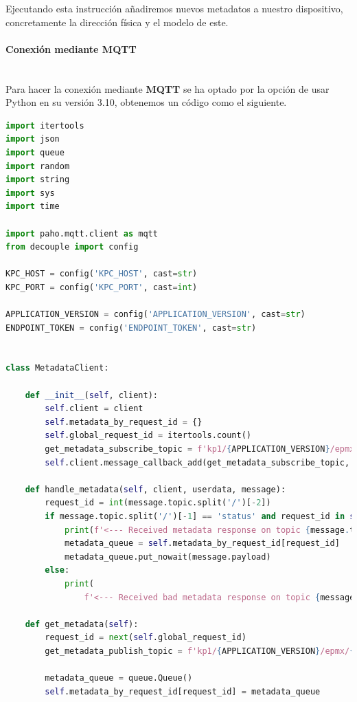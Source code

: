{Ejecutando esta instrucción añadiremos nuevos metadatos a nuestro dispositivo, concretamente la dirección física y el modelo de este.

\paragraph{Conexión mediante MQTT} \label{mqtt-connection} \hspace{0pt} \\

Para hacer la conexión mediante \textbf{MQTT} se ha optado por la opción de usar Python en su versión 3.10, obtenemos un código como el siguiente.

\begin{lstlisting}[language=Python]
import itertools
import json
import queue
import random
import string
import sys
import time

import paho.mqtt.client as mqtt
from decouple import config

KPC_HOST = config('KPC_HOST', cast=str)
KPC_PORT = config('KPC_PORT', cast=int)

APPLICATION_VERSION = config('APPLICATION_VERSION', cast=str)
ENDPOINT_TOKEN = config('ENDPOINT_TOKEN', cast=str)


class MetadataClient:

    def __init__(self, client):
        self.client = client
        self.metadata_by_request_id = {}
        self.global_request_id = itertools.count()
        get_metadata_subscribe_topic = f'kp1/{APPLICATION_VERSION}/epmx/{ENDPOINT_TOKEN}/get/#'
        self.client.message_callback_add(get_metadata_subscribe_topic, self.handle_metadata)

    def handle_metadata(self, client, userdata, message):
        request_id = int(message.topic.split('/')[-2])
        if message.topic.split('/')[-1] == 'status' and request_id in self.metadata_by_request_id:
            print(f'<--- Received metadata response on topic {message.topic}')
            metadata_queue = self.metadata_by_request_id[request_id]
            metadata_queue.put_nowait(message.payload)
        else:
            print(
                f'<--- Received bad metadata response on topic {message.topic}:\n{str(message.payload.decode("utf-8"))}')

    def get_metadata(self):
        request_id = next(self.global_request_id)
        get_metadata_publish_topic = f'kp1/{APPLICATION_VERSION}/epmx/{ENDPOINT_TOKEN}/get/{request_id}'

        metadata_queue = queue.Queue()
        self.metadata_by_request_id[request_id] = metadata_queue


\end{lstlisting}}
